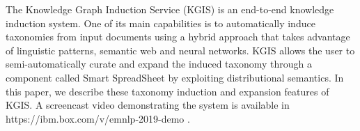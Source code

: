 The Knowledge Graph Induction Service (KGIS) is an end-to-end knowledge induction system.
One of its main capabilities is to automatically induce taxonomies from input documents using a hybrid approach that takes advantage of linguistic patterns, semantic web and neural networks. KGIS allows the user to semi-automatically curate and expand the induced taxonomy through a component called Smart SpreadSheet by exploiting distributional semantics.
In this paper, we describe these taxonomy induction and expansion features of KGIS. A screencast video demonstrating the system is available in https://ibm.box.com/v/emnlp-2019-demo .